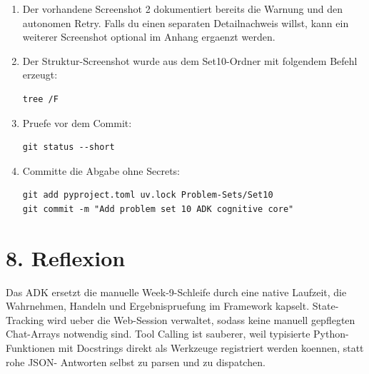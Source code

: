 \documentclass[11pt,a4paper]{article}
\begin{document}
\begin{enumerate}
  \item Der vorhandene Screenshot 2 dokumentiert bereits die Warnung und den autonomen Retry. Falls du einen separaten Detailnachweis willst, kann ein weiterer Screenshot optional im Anhang ergaenzt werden.

  \item Der Struktur-Screenshot wurde aus dem Set10-Ordner mit folgendem Befehl erzeugt:
\begin{verbatim}
tree /F
\end{verbatim}

  \item Pruefe vor dem Commit:
\begin{verbatim}
git status --short
\end{verbatim}

  \item Committe die Abgabe ohne Secrets:
\begin{verbatim}
git add pyproject.toml uv.lock Problem-Sets/Set10
git commit -m "Add problem set 10 ADK cognitive core"
\end{verbatim}
\end{enumerate}

\section*{8. Reflexion}

Das ADK ersetzt die manuelle Week-9-Schleife durch eine native Laufzeit, die
Wahrnehmen, Handeln und Ergebnispruefung im Framework kapselt. State-Tracking
wird ueber die Web-Session verwaltet, sodass keine manuell gepflegten Chat-Arrays
notwendig sind. Tool Calling ist sauberer, weil typisierte Python-Funktionen mit
Docstrings direkt als Werkzeuge registriert werden koennen, statt rohe JSON-
Antworten selbst zu parsen und zu dispatchen.
\end{document}
